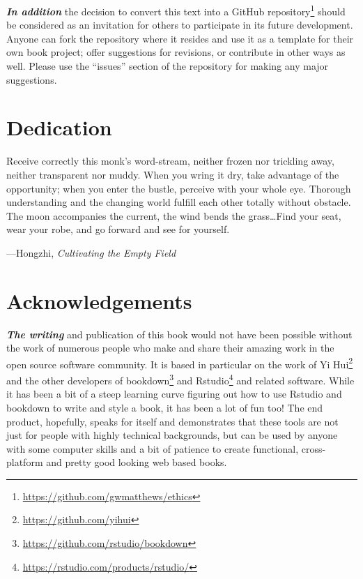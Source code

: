 \documentclass[]{book}
\renewcommand{\href}[2]{#2\footnote{\url{#1}}}
\newenvironment{epigraph}%
{
\begin{flushright}
\begin{minipage}{20em}
\begin{flushright}
\itshape
}%
{
\end{flushright}
\end{minipage}
\end{flushright}
\vspace{1em}
}
\begin{document}
\textbf{\emph{In addition}} the decision to convert this text into a \href{https://github.com/gwmatthews/ethics}{GitHub repository} should be considered as an invitation for others to participate in its future development. Anyone can fork the repository where it resides and use it as a template for their own book project; offer suggestions for revisions, or contribute in other ways as well. Please use the ``issues'' section of the repository for making any major suggestions.

\hypertarget{dedication}{%
\section*{Dedication}\label{dedication}}


\begin{epigraph}
Receive correctly this monk's word-stream, neither frozen nor trickling
away, neither transparent nor muddy. When you wring it dry, take
advantage of the opportunity; when you enter the bustle, perceive with
your whole eye. Thorough understanding and the changing world fulfill
each other totally without obstacle. The moon accompanies the current,
the wind bends the grass\ldots{}Find your seat, wear your robe, and go
forward and see for yourself.

---Hongzhi, \emph{Cultivating the Empty Field}
\end{epigraph}

\hypertarget{acknowledgements}{%
\section*{Acknowledgements}\label{acknowledgements}}


\textbf{\emph{The writing}} and publication of this book would not have been possible without the work of numerous people who make and share their amazing work in the open source software community. It is based in particular on the work of \href{https://github.com/yihui}{Yi Hui} and the other developers of \href{https://github.com/rstudio/bookdown}{bookdown} and \href{https://rstudio.com/products/rstudio/}{Rstudio} and related software. While it has been a bit of a steep learning curve figuring out how to use Rstudio and bookdown to write and style a book, it has been a lot of fun too! The end product, hopefully, speaks for itself and demonstrates that these tools are not just for people with highly technical backgrounds, but can be used by anyone with some computer skills and a bit of patience to create functional, cross-platform and pretty good looking web based books.
\end{document}
